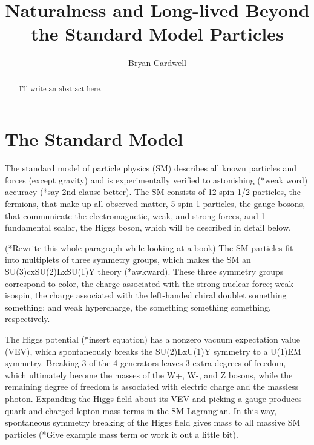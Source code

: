 \documentclass[12pt]{article}
\title{Naturalness and Long-lived Beyond the Standard Model Particles}
\author{Bryan Cardwell}
\begin{document}
\singlespacing

\maketitle

\begin{abstract}

I'll write an abstract here.

\end{abstract}

\newpage
\tableofcontents
\newpage
\doublespacing

\section{The Standard Model}
    The standard model of particle physics (SM) describes all known particles and forces (except gravity) and is experimentally verified to astonishing (*weak word) accuracy (*say 2nd clause better). The SM consists of 12 spin-1/2 particles, the fermions, that make up all observed matter, 5 spin-1 particles, the gauge bosons, that communicate the electromagnetic, weak, and strong forces, and 1 fundamental scalar, the Higgs boson, which will be described in detail below.
    
    (*Rewrite this whole paragraph while looking at a book)
    The SM particles fit into multiplets of three symmetry groups, which makes the SM an SU(3)cxSU(2)LxSU(1)Y theory (*awkward). These three symmetry groups correspond to color, the charge associated with the strong nuclear force; weak isospin, the charge associated with the left-handed chiral doublet something something; and weak hypercharge, the something something something, respectively. 

    The Higgs potential (*insert equation) has a nonzero vacuum expectation value (VEV), which spontaneously breaks the SU(2)LxU(1)Y symmetry to a U(1)EM symmetry. Breaking 3 of the 4 generators leaves 3 extra degrees of freedom, which ultimately become the masses of the W+, W-, and Z bosons, while the remaining degree of freedom is associated with electric charge and the massless photon. Expanding the Higgs field about its VEV and picking a gauge produces quark and charged lepton mass terms in the SM Lagrangian. In this way, spontaneous symmetry breaking of the Higgs field gives mass to all massive SM particles (*Give example mass term or work it out a little bit).
\end{document}
